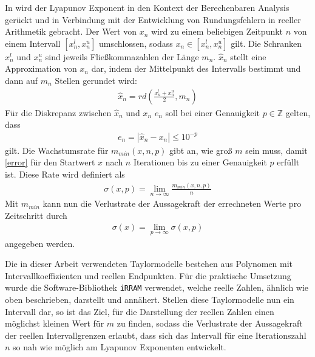 In \cite{DBLP:spandl} wird der Lyapunov Exponent in den Kontext der Berechenbaren Analysis gerückt und in Verbindung mit der Entwicklung von Rundungsfehlern in reeller Arithmetik gebracht. Der Wert von $x_n$ wird zu einem beliebigen Zeitpunkt $n$ von einem Intervall $[x_n^l,x_n^u]$ umschlossen, sodass $x_n \in [x_n^l,x_n^u]$ gilt. Die Schranken $x_n^l$ und $x_n^u$ sind jeweils Fließkommazahlen der Länge $m_n$. $\hat{x}_n$ stellt eine Approximation von $x_n$ dar, indem der Mittelpunkt des Intervalls bestimmt und dann auf $m_n$ Stellen gerundet wird:
\begin{align}
 \hat{x}_n = rd(\frac{x^l_n + x^u_n}{2}, m_n)
\end{align}
Für die Diskrepanz zwischen $\hat{x}_n$ und $x_n$ $e_n$ soll bei einer Genauigkeit $p \in \mathbb{Z}$ gelten, dass
\begin{align}
\label{error}
 e_n = |\hat{x}_n - x_n| \leq 10^{-p}
\end{align}
gilt. Die Wachstumsrate für $m_{min}(x,n,p)$ gibt an, wie groß $m$ sein muss, damit \ref{error} für den Startwert $x$ nach $n$ Iterationen bis zu einer Genauigkeit $p$ erfüllt ist. Diese Rate wird definiert als
\begin{align}
 \sigma(x,p) = \lim_{n \rightarrow \infty} \frac{m_{min}(x,n,p)}{n}
\end{align}
Mit $m_{min}$ kann nun die Verlustrate der Aussagekraft der errechneten Werte pro Zeitschritt durch  
\begin{align}
 \sigma(x) = \lim_{p \rightarrow \infty} \sigma(x,p)
\end{align}
angegeben werden. 

Die in dieser Arbeit verwendeten Taylormodelle bestehen aus Polynomen mit Intervallkoeffizienten und reellen Endpunkten. Für die praktische Umsetzung wurde die Software-Bibliothek \verb+iRRAM+ \cite{Mller2009EnhancingIE} verwendet, welche reelle Zahlen, ähnlich wie oben beschrieben, darstellt und annähert. Stellen diese Taylormodelle nun ein Intervall dar, so ist das Ziel, für die Darstellung der reellen Zahlen einen möglichst kleinen Wert für $m$ zu finden, sodass die Verlustrate der Aussagekraft der reellen Intervallgrenzen erlaubt, dass sich das Intervall für eine Iterationszahl $n$ so nah wie möglich am Lyapunov Exponenten entwickelt. 

